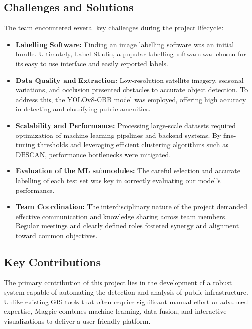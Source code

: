 \subsection{Challenges and Solutions}
The team encountered several key challenges during the project lifecycle:
\begin{itemize}
    \item \textbf{Labelling Software:} Finding an image labelling software was
    an initial hurdle. Ultimately, Label Studio, a popular labelling software
    was chosen for its easy to use interface and easily exported labels.
    \vspace{0.2cm}

    \item \textbf{Data Quality and Extraction:} Low-resolution satellite
    imagery, seasonal variations, and occlusion presented obstacles to accurate
    object detection. To address this, the YOLOv8-OBB model was employed,
    offering high accuracy in detecting and classifying public amenities.
    \vspace{0.2cm}

    \item \textbf{Scalability and Performance:} Processing large-scale datasets
    required optimization of machine learning pipelines and backend systems. By
    fine-tuning thresholds and leveraging efficient clustering algorithms such
    as DBSCAN, performance bottlenecks were mitigated.
    \vspace{0.2cm}

    \item \textbf{Evaluation of the ML submodules:} The careful selection and
    accurate labelling of each test set was key in correctly evaluating our
    model's performance.
    \vspace{0.2cm}

    \item \textbf{Team Coordination:} The interdisciplinary nature of the
    project demanded effective communication and knowledge sharing across team
    members. Regular meetings and clearly defined roles fostered synergy and
    alignment toward common objectives.
\end{itemize}

\newpage{}

\subsection{Key Contributions}
The primary contribution of this project lies in the development of a robust
system capable of automating the detection and analysis of public
infrastructure. Unlike existing GIS tools that often require significant manual
effort or advanced expertise, Magpie combines machine learning, data fusion, and
interactive visualizations to deliver a user-friendly platform.

